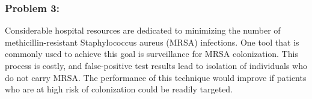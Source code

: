 \subsubsection{Problem 3: }

Considerable hospital resources are dedicated to minimizing the number of methicillin-resistant Staphylococcus aureus (MRSA) infections. One tool that is commonly used to achieve this goal is surveillance for MRSA colonization. This process is costly, and false-positive test results lead to isolation of individuals who do not carry MRSA. The performance of this technique would improve if patients who are at high risk of colonization could be readily targeted.

